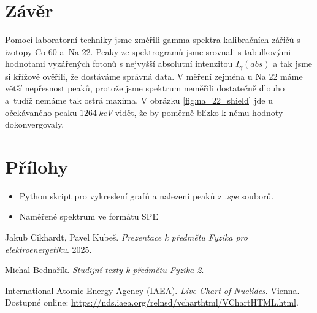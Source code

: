 \documentclass[a4paper,12pt]{article}
\begin{document}
\newpage
\section{Závěr}
Pomocí laboratorní techniky jsme změřili gamma spektra kalibračních zářičů s izotopy Co 60 a~Na 22. Peaky ze spektrogramů jsme srovnali s tabulkovými hodnotami \cite{iaea} vyzářených fotonů s nejvyšší absolutní intenzitou $I_\gamma (abs)$ a tak jsme si křížově ověřili, že dostáváme správná data. V měření zejména u Na 22 máme větší nepřesnost peaků, protože jsme spektrum neměřili dostatečně dlouho a~tudíž nemáme tak ostrá maxima. 
V obrázku \ref{fig:na_22_shield} jde u očekávaného peaku $1264\ keV$ vidět, že by poměrně blízko k němu hodnoty dokonvergovaly.

\section{Přílohy}
\begin{itemize}
    \item Python skript pro vykreslení grafů a nalezení peaků z \textit{.spe} souborů.
    \item Naměřené spektrum ve formátu SPE
\end{itemize}

\begin{thebibliography}{}

    Jakub Cikhardt, Pavel Kubeš. \textit{Prezentace k předmětu Fyzika pro elektroenergetiku}. 2025.

    Michal Bednařík. \textit{Studijní texty k předmětu Fyzika 2}.
    
    International Atomic Energy Agency (IAEA). \textit{Live Chart of Nuclides}. Vienna. Dostupné online: \url{https://nds.iaea.org/relnsd/vcharthtml/VChartHTML.html}.


\end{thebibliography}
\end{document}

